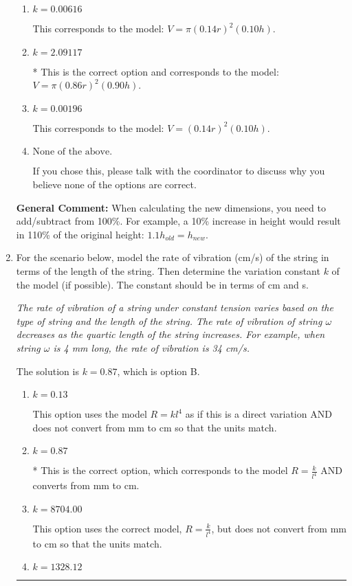 \documentclass{extbook}[14pt]
\newcommand{\litem}[1]{\item #1

\rule{\textwidth}{0.4pt}}
\begin{document}
\begin{enumerate}
{\begin{enumerate}[label=\Alph*.]
This corresponds to the model: $V = (0.86 r)^2 (0.90 h)$.
\item \( k = 0.00616 \)

This corresponds to the model: $V = \pi (0.14 r)^2 (0.10 h)$.
\item \( k = 2.09117 \)

* This is the correct option and corresponds to the model: $V = \pi (0.86 r)^2 (0.90 h)$.
\item \( k = 0.00196 \)

This corresponds to the model: $V = (0.14 r)^2 (0.10 h)$.
\item \( \text{None of the above.} \)

If you chose this, please talk with the coordinator to discuss why you believe none of the options are correct.
\end{enumerate}

\textbf{General Comment:} When calculating the new dimensions, you need to add/subtract from 100\%. For example, a 10\% increase in height would result in 110\% of the original height: $1.1h_{old} = h_{new}$.
}
\litem{
For the scenario below, model the rate of vibration (cm/s) of the string in terms of the length of the string. Then determine the variation constant $k$ of the model (if possible). The constant should be in terms of cm and s.

\begin{center}
    \textit{ The rate of vibration of a string under constant tension varies based on the type of string and the length of the string. The rate of vibration of string $\omega$ decreases as the quartic length of the string increases. For example, when string $\omega$ is 4 mm long, the rate of vibration is 34 cm/s. }
\end{center}
The solution is \( k = 0.87 \), which is option B.\begin{enumerate}[label=\Alph*.]
\item \( k = 0.13 \)

This option uses the model $R = kl^{4}$ as if this is a direct variation AND does not convert from mm to cm so that the units match.
\item \( k = 0.87 \)

* This is the correct option, which corresponds to the model $R = \frac{k}{l^{4}}$ AND converts from mm to cm.
\item \( k = 8704.00 \)

This option uses the correct model, $R = \frac{k}{l^{4}}$, but does not convert from mm to cm so that the units match.
\item \( k = 1328.12 \)


\end{enumerate}}
\end{enumerate}
\end{document}
